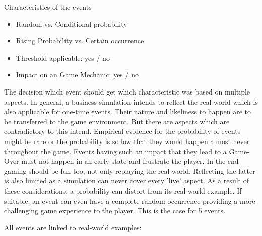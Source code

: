 \documentclass[11pt,titlepage,oneside,openany]{book}
\begin{document}
Characteristics of the events
\begin{itemize}
\item Random vs. Conditional probability
\item Rising Probability vs. Certain occurrence
\item Threshold applicable: yes / no
\item Impact on an Game Mechanic: yes / no
\end{itemize}
The decision which event should get which characteristic was based on multiple aspects. In general, a business simulation intends to reflect the real-world which is also applicable for one-time events. Their nature and likeliness to happen are to be transferred to the game environment. But there are aspects which are contradictory to this intend. Empirical evidence for the probability of events might be rare or the probability is so low that they would happen almost never throughout the game. Events having such an impact that they lead to a Game-Over must not happen in an early state and frustrate the player. In the end gaming should be fun too, not only replaying the real-world. Reflecting the latter is also limited as a simulation can never cover every 'live' aspect. As a result of these considerations, a probability can distort from its real-world example. If suitable, an event can even have a complete random occurrence providing a more challenging game experience to the player. This is the case for 5 events. 

All events are linked to real-world examples:
\end{document}
